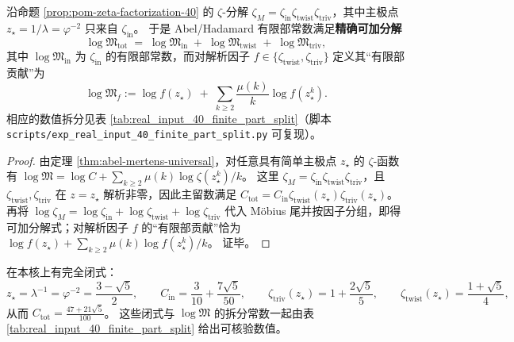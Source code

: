 \begin{corollary}\label{cor:pom-logM-split-40}
沿命题 \ref{prop:pom-zeta-factorization-40} 的 \(\zeta\)-分解
\(
\zeta_M=\zeta_{\mathrm{in}}\zeta_{\mathrm{twist}}\zeta_{\mathrm{triv}}
\)，其中主极点 \(z_\star=1/\lambda=\varphi^{-2}\) 只来自 \(\zeta_{\mathrm{in}}\)。
于是 Abel/Hadamard 有限部常数满足\textbf{精确可加分解}
\[
\log\mathfrak{M}_{\mathrm{tot}}
\;=\;
\log\mathfrak{M}_{\mathrm{in}}
\;+\;
\log\mathfrak{M}_{\mathrm{twist}}
\;+\;
\log\mathfrak{M}_{\mathrm{triv}},
\]
其中 \(\log\mathfrak{M}_{\mathrm{in}}\) 为 \(\zeta_{\mathrm{in}}\) 的有限部常数，而对解析因子 \(f\in\{\zeta_{\mathrm{twist}},\zeta_{\mathrm{triv}}\}\) 定义其“有限部贡献”为
\[
\log\mathfrak{M}_f
:=
\log f(z_\star)
\;+\;
\sum_{k\ge 2}\frac{\mu(k)}{k}\log f(z_\star^k).
\]
相应的数值拆分见表 \ref{tab:real_input_40_finite_part_split}（脚本 \texttt{scripts/exp\_real\_input\_40\_finite\_part\_split.py} 可复现）。
\end{corollary}

\begin{proof}
由定理 \ref{thm:abel-mertens-universal}，对任意具有简单主极点 \(z_\star\) 的 \(\zeta\)-函数有
\(
\log\mathfrak{M}=\log C+\sum_{k\ge 2}\mu(k)\log\zeta(z_\star^k)/k
\)。
这里 \(\zeta_M=\zeta_{\mathrm{in}}\zeta_{\mathrm{twist}}\zeta_{\mathrm{triv}}\)，且 \(\zeta_{\mathrm{twist}},\zeta_{\mathrm{triv}}\) 在 \(z=z_\star\) 解析非零，因此主留数满足
\(
C_{\mathrm{tot}}=C_{\mathrm{in}}\zeta_{\mathrm{twist}}(z_\star)\zeta_{\mathrm{triv}}(z_\star)
\)。
再将 \(\log\zeta_M=\log\zeta_{\mathrm{in}}+\log\zeta_{\mathrm{twist}}+\log\zeta_{\mathrm{triv}}\) 代入 Möbius 尾并按因子分组，即得可加分解式；对解析因子 \(f\) 的“有限部贡献”恰为
\(
\log f(z_\star)+\sum_{k\ge2}\mu(k)\log f(z_\star^k)/k
\)。
证毕。
\end{proof}

\begin{remark}[主极点与留数的代数闭式]\label{rem:pom-logM-split-40-exact}
在本核上有完全闭式：
\[
z_\star=\lambda^{-1}=\varphi^{-2}=\frac{3-\sqrt5}{2},
\qquad
C_{\mathrm{in}}=\frac{3}{10}+\frac{7\sqrt5}{50},
\qquad
\zeta_{\mathrm{triv}}(z_\star)=1+\frac{2\sqrt5}{5},
\qquad
\zeta_{\mathrm{twist}}(z_\star)=\frac{1+\sqrt5}{4},
\]
从而
\(
C_{\mathrm{tot}}=\frac{47+21\sqrt5}{100}
\)。
这些闭式与 \(\log\mathfrak{M}\) 的拆分常数一起由表 \ref{tab:real_input_40_finite_part_split} 给出可核验数值。
\end{remark}



